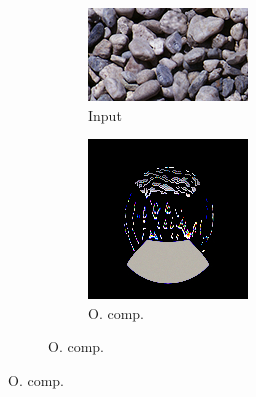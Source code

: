 \begin{figure}[]
\begin{subfigure}{\textwidth}
        \begin{subfigure}{0.19\textwidth}
            \centering
            \includegraphics[width=\textwidth]{images/04-experiment03/ball_pebble_target.jpg}
            \caption{Input}
            \label{fig:ex03-ball_dof-pebbles-target}
        \end{subfigure}
        \hfill
        \begin{subfigure}{0.19\textwidth}
            \centering
            \includegraphics[width=\textwidth]{images/04-experiment03/ball_dof/pebbles/stats_im.jpg}
            \caption{O. comp.}
            \label{fig:ex03-ball_dof-pebbles-stats_im}

\end{subfigure}
\end{subfigure}
\end{figure}
